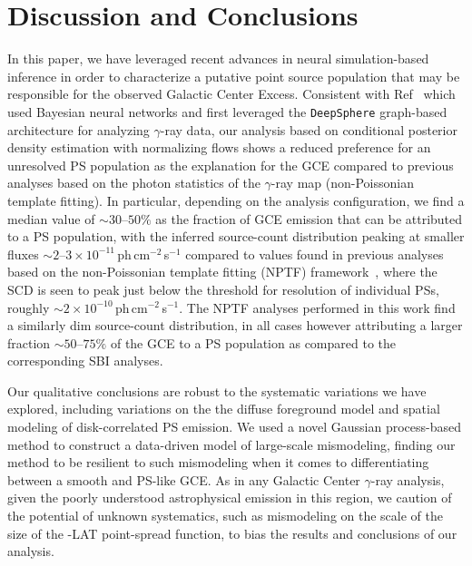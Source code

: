 \documentclass[prd,aps,10pt,nofootinbib,twocolumn,superscriptaddress,preprintnumbers,balancelastpage,longbibliography]{revtex4-1}
\begin{document}

\section{Discussion and Conclusions}
\label{sec:conclusion}

In this paper, we have leveraged recent advances in neural simulation-based inference in order to characterize a putative point source population that may be responsible for the observed \Fermi Galactic Center Excess. Consistent with Ref~\cite{List:2020mzd} which used Bayesian neural networks and first leveraged the \texttt{DeepSphere} graph-based architecture for analyzing $\gamma$-ray data, our analysis based on conditional posterior density estimation with normalizing flows shows a reduced preference for an unresolved PS population as the explanation for the GCE compared to previous analyses based on the photon statistics of the $\gamma$-ray map (non-Poissonian template fitting). In particular, depending on the analysis configuration, we find a median value of $\sim30$--$50\%$ as the fraction of GCE emission that can be attributed to a PS population, with the inferred source-count distribution peaking at smaller fluxes $\sim2$--$3\times 10^{-11}$\,ph\,cm$^{-2}$\,s$^{-1}$ compared to values found in previous analyses based on the non-Poissonian template fitting (NPTF) framework~\cite{Lee:2015fea}, where the SCD is seen to peak just below the threshold for resolution of individual PSs, roughly $\sim2\times 10^{-10}$\,ph\,cm$^{-2}$\,s$^{-1}$. The NPTF analyses performed in this work find a similarly dim source-count distribution, in all cases however attributing a larger fraction $\sim50$--$75\%$ of the GCE to a PS population as compared to the corresponding SBI analyses.

Our qualitative conclusions are robust to the systematic variations we have explored, including variations on the the diffuse foreground model and spatial modeling of disk-correlated PS emission. We used a novel Gaussian process-based method to construct a data-driven model of large-scale mismodeling, finding our method to be resilient to such mismodeling when it comes to differentiating between a smooth and PS-like GCE. As in any Galactic Center $\gamma$-ray analysis, given the poorly understood astrophysical emission in this region, we caution of the potential of unknown systematics, such as mismodeling on the scale of the size of the \Fermi-LAT point-spread function, to bias the results and conclusions of our analysis.
\end{document}
